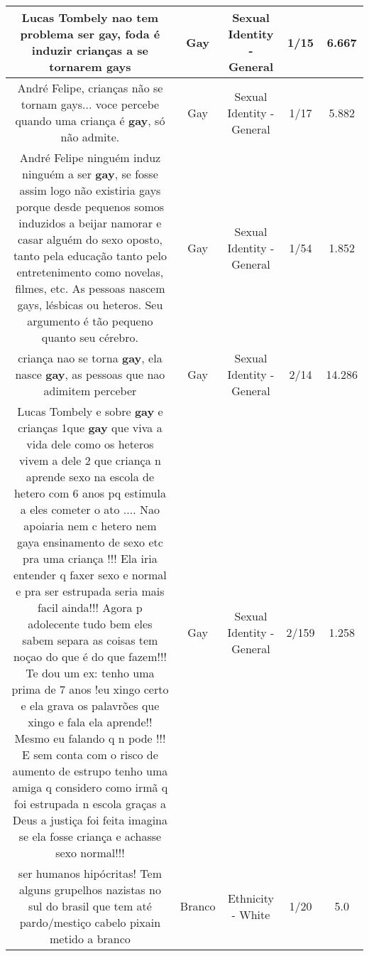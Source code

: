 \documentclass[11pt]{article}
\newlength\mylength
\begin{document}
\begin{center}
\begin{longtable}{|C{.65\mylength}|C{.30\mylength}|C{.12\mylength}|C{.12\mylength}|C{.12\mylength}|}
  \small Lucas Tombely nao tem problema ser \textbf{gay}, foda é induzir crianças a se tornarem gays\normalsize   & Gay & Sexual Identity - General & 1/15 & 6.667 \\  \hline
  \small André Felipe, crianças não se tornam gays... voce percebe quando uma criança é \textbf{gay}, só não admite.\normalsize   & Gay & Sexual Identity - General & 1/17 & 5.882 \\  \hline
  \small André Felipe ninguém induz ninguém a ser \textbf{gay}, se fosse assim logo não existiria gays porque desde pequenos somos induzidos a beijar namorar e casar alguém do sexo oposto, tanto pela educação tanto pelo entretenimento como novelas, filmes, etc. As pessoas nascem gays, lésbicas ou heteros. Seu argumento é tão pequeno quanto seu cérebro.\normalsize   & Gay & Sexual Identity - General & 1/54 & 1.852 \\  \hline
  \small criança nao se torna \textbf{gay}, ela nasce \textbf{gay}, as pessoas que nao adimitem perceber\normalsize   & Gay & Sexual Identity - General & 2/14 & 14.286 \\  \hline
  \small Lucas Tombely e sobre \textbf{gay} e crianças 1que \textbf{gay} que viva a vida dele como os heteros vivem a dele 2 que criança n aprende sexo na escola de hetero com 6 anos pq estimula a eles cometer o ato .... Nao apoiaria nem c hetero nem gaya ensinamento de sexo etc pra uma criança !!! Ela iria entender q faxer sexo e normal e pra ser estrupada seria mais facil ainda!!! Agora p adolecente tudo bem eles sabem separa as coisas tem noçao do que é do que fazem!!! Te dou um ex: tenho uma prima de 7 anos !eu xingo certo e ela grava os palavrões que xingo e fala ela aprende!! Mesmo eu falando q n pode !!! E sem conta com o risco de aumento de estrupo tenho uma amiga q considero como irmã q foi estrupada n escola graças a Deus a justiça foi feita imagina se ela fosse criança e achasse sexo normal!!!\normalsize   & Gay & Sexual Identity - General & 2/159 & 1.258 \\  \hline
  \small ser humanos hipócritas!  Tem alguns grupelhos nazistas no sul do brasil que tem até pardo/mestiço cabelo pixain metido a branco\normalsize   & Branco & Ethnicity - White & 1/20 & 5.0 \\  \hline

\end{longtable}
\end{center}
\end{document}
